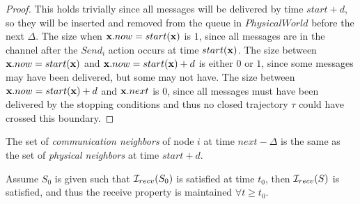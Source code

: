 \documentclass[10pt, conference, compsocconf]{IEEEtran}
\begin{document}
\begin{proof}
This holds trivially since all messages will be delivered by time $start + d$, so they will be inserted and removed from the queue in $PhysicalWorld$ before the next $\Delta$.  The size when ${\bf x}.now = start({\bf x})$ is $1$, since all messages are in the channel after the $Send_i$ action occurs at time $start({\bf x})$.  The size between ${\bf x}.now = start({\bf x})$ and ${\bf x}.now = start({\bf x}) + d$ is either $0$ or $1$, since some messages may have been delivered, but some may not have.  The size between ${\bf x}.now = start({\bf x}) + d$ and ${\bf x}.next$ is $0$, since all messages must have been delivered by the stopping conditions and thus no closed trajectory $\tau$ could have crossed this boundary.
\end{proof}

\begin{inv}
The set of \textit{communication neighbors} of node $i$ at time $next - \Delta$ is the same as the set of \textit{physical neighbors} at time $start + d$.

Assume $S_0$ is given such that ${\cal I}_{recv}(S_0)$ is satisfied at time $t_0$, then ${\cal I}_{recv}(S)$ is satisfied, and thus the receive property is maintained $\forall t \geq t_0$.
\end{inv}
\end{document}
